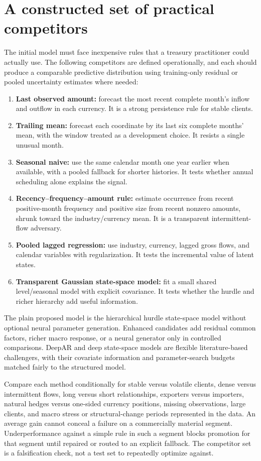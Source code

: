 \section{A constructed set of practical competitors}
The initial model must face inexpensive rules that a treasury practitioner could actually use. The following competitors are defined operationally, and each should produce a comparable predictive distribution using training-only residual or pooled uncertainty estimates where needed:
\begin{enumerate}[leftmargin=*,itemsep=3pt]
\item \textbf{Last observed amount:} forecast the most recent complete month's inflow and outflow in each currency. It is a strong persistence rule for stable clients.
\item \textbf{Trailing mean:} forecast each coordinate by its last six complete months' mean, with the window treated as a development choice. It resists a single unusual month.
\item \textbf{Seasonal naive:} use the same calendar month one year earlier when available, with a pooled fallback for shorter histories. It tests whether annual scheduling alone explains the signal.
\item \textbf{Recency--frequency--amount rule:} estimate occurrence from recent positive-month frequency and positive size from recent nonzero amounts, shrunk toward the industry/currency mean. It is a transparent intermittent-flow adversary.
\item \textbf{Pooled lagged regression:} use industry, currency, lagged gross flows, and calendar variables with regularization. It tests the incremental value of latent states.
\item \textbf{Transparent Gaussian state-space model:} fit a small shared level/seasonal model with explicit covariance. It tests whether the hurdle and richer hierarchy add useful information.
\end{enumerate}
The plain proposed model is the hierarchical hurdle state-space model without optional neural parameter generation. Enhanced candidates add residual common factors, richer macro response, or a neural generator only in controlled comparisons. DeepAR and deep state-space models are flexible literature-based challengers, with their covariate information and parameter-search budgets matched fairly to the structured model.

Compare each method conditionally for stable versus volatile clients, dense versus intermittent flows, long versus short relationships, exporters versus importers, natural hedges versus one-sided currency positions, missing observations, large clients, and macro stress or structural-change periods represented in the data. An average gain cannot conceal a failure on a commercially material segment. Underperformance against a simple rule in such a segment blocks promotion for that segment until repaired or routed to an explicit fallback. The competitor set is a falsification check, not a test set to repeatedly optimize against.

